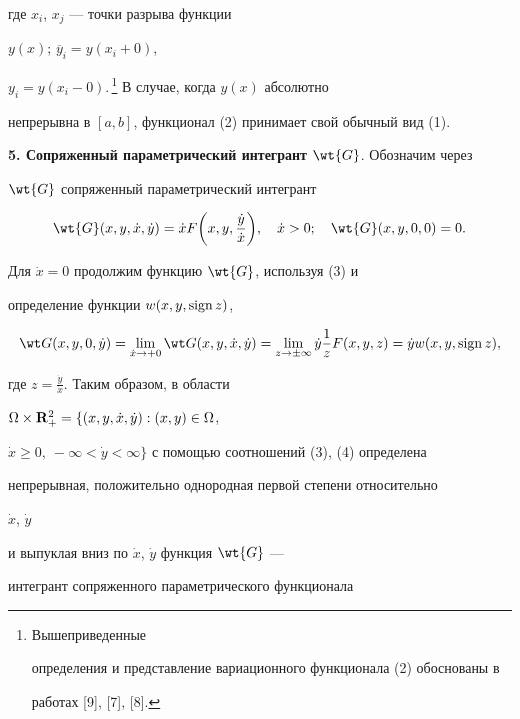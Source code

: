 где $x_i$, $x_j$ --- точки разрыва функции


$y(x)$; $\overline{y}_i=y(x_i+0)$,


$y_i=y(x_i-0)$.\,\footnote{Вышеприведенные


определения и представление вариационного функционала (2) обоснованы в


работах [9], [7], [8].} В случае, когда $y(x)$ абсолютно


непрерывна в $[a,b]$, функционал (2) принимает свой обычный вид (1).





{\bf 5. Сопряженный параметрический интегрант $\wt{G}$}. Обозначим через


$\wt{G}$ сопряженный параметрический интегрант


\begin{equation}


\wt{G}(x,y,\Dot{x},\Dot{y})=\Dot{x}F


\bigg(x,y,\frac{\Dot{y}}{\Dot{x}}\bigg),\quad \Dot{x}>0;


\quad \wt{G}(x,y,0,0)=0.


\end{equation}


Для $\Dot{x}=0$ продолжим функцию $\wt{G}$, используя (3) и


определение функции $w(x,y,\operatorname{sign} z)$,


\begin{equation}


\wt G(x,y,0,\Dot{y}) =\lim_{\Dot{x}\to+0}\wt G(x,y,\Dot{x},\Dot{y})


=\lim_{z\to\pm\infty}\Dot{y}\frac{1}{z}F(x,y,z)=\Dot{y}w(x,y,\sign z),


\end{equation}


где $z=\frac{\Dot{y}}{\Dot{x}}$. Таким образом, в области


$\Omega\times{\bold R}_+^2=\{(x,y,\Dot{x},\Dot{y}):(x,y)\in\Omega$,


$\Dot{x}\geq


0,\ -\infty<\Dot{y}<\infty\}$ с помощью соотношений (3), (4) определена


непрерывная, положительно однородная первой степени относительно


$\Dot{x}$, $\Dot{y}$


и выпуклая вниз по $\Dot{x}$, $\Dot{y}$ функция $\wt{G}$ ---


интегрант сопряженного параметрического функционала



